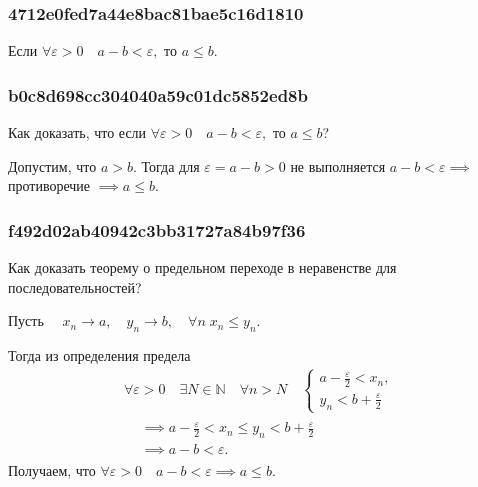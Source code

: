 \documentclass[11pt, a5paper]{article}
\newenvironment{note}[1]{\goodbreak\par\subsubsection{\hfill \color{lightgray}\tiny #1}}{}
\newenvironment{cloze}[2][\ldots]{\begin{leftbar}}{\end{leftbar}}
\newenvironment{icloze}[2][\ldots]{%
  \ignorespaces\text{\tiny \color{lightgray} \{\{c#2:: }%
}{%
  \text{\tiny \color{lightgray}\}\}}\unskip%
}
\begin{document}
    \begin{note}{4712e0fed7a44e8bac81bae5c16d1810}
        Если \( \forall \varepsilon > 0 \quad a - b < \varepsilon, \) то
        \begin{icloze}{1}\( a \leqslant b. \)\end{icloze}
    \end{note}

    \begin{note}{b0c8d698cc304040a59c01dc5852ed8b}
        Как доказать, что если \( \forall \varepsilon > 0 \quad a - b <
        \varepsilon, \) то \( a \leqslant b \)?

        \begin{cloze}{1}
            Допустим, что \( a > b. \) Тогда для \( \varepsilon = a - b > 0 \)
            не выполняется \( a - b < \varepsilon \implies  \) противоречие \(
            \implies a \leqslant b. \)
        \end{cloze}
    \end{note}

    \begin{note}{f492d02ab40942c3bb31727a84b97f36}
        Как доказать теорему о предельном переходе в неравенстве для
        последовательностей?

        \begin{cloze}{1}
            Пусть \( \quad x_n \to a, \quad y_n \to b, \quad \forall n\; x_n
            \leqslant y_n. \)

            Тогда из определения предела \[
                \begin{gathered}
                    \forall \varepsilon > 0 \quad \exists N \in \mathbb N \quad
                    \forall n > N \quad \begin{cases}
                        a - \frac{\varepsilon}{2} < x_n, \\
                        y_n < b + \frac{\varepsilon}{2}
                    \end{cases} \\
                    \begin{aligned}
                        &\implies a - \frac{\varepsilon}{2} < x_n \leqslant y_n < b + \frac{\varepsilon}{2} \\
                        &\implies a - b < \varepsilon.
                    \end{aligned}
                \end{gathered}
            \]
            Получаем, что \( \forall \varepsilon > 0 \quad a - b < \varepsilon
            \implies a \leqslant b. \)
        \end{cloze}
    \end{note}
\end{document}

